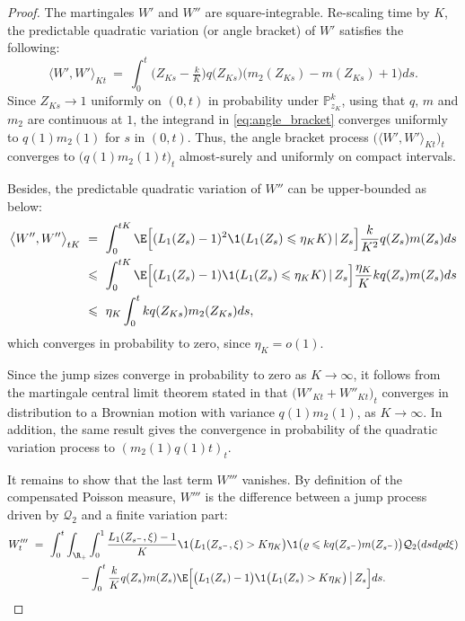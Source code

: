 \begin{refsegment}
\begin{proof}
The martingales $ W'$ and $ W''$ are square-integrable. Re-scaling time by $K$, the predictable quadratic variation (or angle bracket) of $W'$ satisfies the following: 
      \begin{equation}\label{eq:angle_bracket}
        \big\langle W', W' \big\rangle _{Kt}
        \  =\ \int_0^{t} \big(Z_{Ks}- \tfrac{k}{K})q(Z_{Ks}\big)\big(m_2(Z_{Ks})-m({Z}_{Ks})+1\big)ds.
      \end{equation}
Since $Z_{Ks}\to 1$ uniformly on $(0,t)$ in probability under $\mathbb{P}^k_{z_K}$,
using that $q,\, m$ and $m_2$ are  continuous at $1$, the integrand in
\eqref{eq:angle_bracket} converges uniformly to $q(1)m_2(1)$ for $s$ in
$(0,t)$. Thus, the angle bracket process
$\big( \big\langle W', W' \big\rangle _{Kt}\big)_t$ converges to $\big(q(1)m_2(1)t\big)_t$
almost-surely and uniformly on compact intervals.

Besides, the predictable quadratic variation of $W''$ can be
upper-bounded as below:
\begin{align*}
 \big\langle W'', W'' \big\rangle _{tK}\ &=\ \int_0^{tK} \E\Big[(L_1(Z_s)-1)^2\1(L_1(Z_s)\leqslant \eta_K K)\,\vert\, Z_s \Big] \frac{k}{K^2} q(Z_s)m(Z_s) ds\\
  & \leqslant\ \int_0^{tK}  \E\Big[(L_1(Z_s)-1)\1(L_1(Z_s)\leqslant \eta_K K)\,\vert\, Z_s \Big]  \frac{\eta_K}{K} k q(Z_s)m(Z_s)  ds\\
  &\leqslant\ \eta_K \int_0^{t} k q(Z_{Ks})m_2(Z_{Ks}) ds,
\end{align*}
which converges in probability to zero, since $\eta_K=o(1)$.

Since the jump sizes converge in probability to zero
as $K\to\infty$, it follows from  the martingale central limit theorem
stated in \citet*[Chapter~VIII, Theorem~3.11]{jacod-shiryaev} that 
$\big(W'_{Kt}+W''_{Kt}\big)_t$ converges in distribution to a
Brownian motion with variance $q(1)m_2(1)$, as $K\to\infty$. In addition, the same result gives the convergence in probability of the quadratic variation process to $(m_2(1)q(1)t)_t$.

 It remains to show that the last term $W'''$ vanishes. By
definition of the compensated Poisson measure, $W'''$ is the
difference between a jump process driven by $\mathcal{Q}_2$  and a finite
variation part:
 \begin{multline*}
    W'''_t\ =\ 
 \int_0^t \int_{\R_+} \int_0^1 \frac{L_1(Z_{s^-},\xi)-1}{K} \1\big(L_1(Z_{s^-},\xi)> K \eta_K \big)\1\big(\varrho \leqslant k q({Z}_{s^-}) m(Z_{s^-})\big)  \mathcal{Q}_2( ds d\varrho d\xi)\\
-\int_0^t\frac{k}{K}q({Z}_{s}) m(Z_{s})\E\Big[\big(L_1(Z_{s})-1\big) \1\big(L_1(Z_{s})> K \eta_K \big)\,  \big\vert\,  Z_{s}\Big]  ds.
 \end{multline*}


\end{proof}
\end{refsegment}
